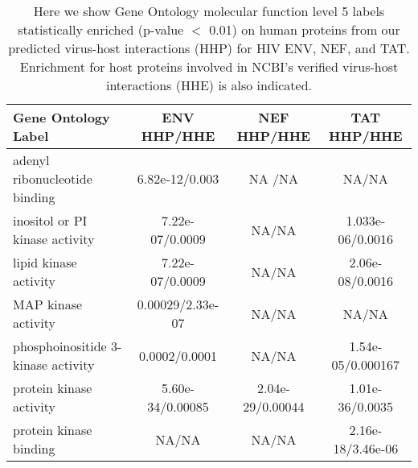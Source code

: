 \begin{table}\footnotesize
\begin{center}
  \begin{tabular}{|l|c|c|c|}
  \hline
  Gene Ontology Label & ENV HHP/HHE & NEF HHP/HHE & TAT HHP/HHE\\
  \hline
adenyl ribonucleotide binding  &  6.82e-12/0.003   &     NA /NA & NA/NA\\
inositol or PI kinase activity  & 7.22e-07/0.0009 &  NA/NA   &   1.033e-06/0.0016\\
lipid kinase activity   & 7.22e-07/0.0009   &    NA/NA &     2.06e-08/0.0016 \\
MAP kinase activity  &   0.00029/2.33e-07   &    NA/NA  &    NA/NA\\
phosphoinositide 3-kinase activity  &    0.0002/0.0001  &     NA/NA  &     1.54e-05/0.000167 \\
protein kinase activity & 5.60e-34/0.00085    &    2.04e-29/0.00044    &    1.01e-36/0.0035\\
protein kinase binding  & NA/NA  &    NA/NA   &   2.16e-18/3.46e-06\\
\hline
  \end{tabular}
\end{center}
\caption[Gene Ontology molecular function enrichment for predicted and
  experimentally verified HIV targeted human proteins]{\small Here we
  show Gene Ontology molecular function level 5 labels statistically
  enriched (p-value $<$ 0.01) on human proteins from our predicted
  virus-host interactions (HHP) for HIV ENV, NEF, and TAT. Enrichment
  for host proteins involved in NCBI's verified virus-host
  interactions (HHE) is also indicated.\label{tbl:medGen2:GO}}
\end{table}
